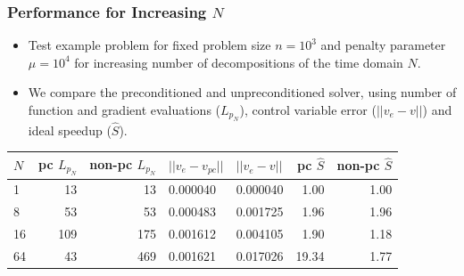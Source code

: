 \documentclass[9pt]{beamer}
\begin{document}
\begin{frame}
\frametitle{Performance for Increasing $N$}
\begin{itemize}
\item{Test example problem for fixed problem size $n=10^3$ and penalty parameter $\mu=10^4$ for increasing number of decompositions of the time domain $N$.}
\item{We compare the preconditioned and unpreconditioned solver, using number of function and gradient evaluations ($L_{p_N}$), control variable error ($||v_e-v||$) and ideal speedup ($\hat{S}$).}
\end{itemize}
{\small\begin{table}[h]
\centering
\begin{tabular}{lrrllrr}
\toprule
{}$N$ &  pc $L_{p_N}$ &  non-pc $L_{p_N}$ &       $||v_e-v_{pc}||$ &  $||v_e-v||$  &  pc $\hat{S}$ &  non-pc $\hat{S}$ \\
\midrule
1   &     13 &      13 &  0.000040 &    0.000040 &    1.00 &        1.00 \\
8   &     53 &      53 &  0.000483 &    0.001725 &    1.96 &        1.96 \\
16  &    109 &     175 &  0.001612 &    0.004105 &    1.90 &        1.18 \\
64  &     43 &     469 &  0.001621 &    0.017026 &   19.34 &        1.77 \\
\bottomrule
\end{tabular}
\end{table}}
\end{frame}
\end{document}
